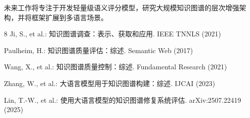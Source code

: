 \documentclass[runningheads]{llncs}
\begin{document}
未来工作将专注于开发轻量级语义评分模型，研究大规模知识图谱的层次增强架构，并将框架扩展到多语言场景。

\begin{thebibliography}{8}
Ji, S., et al.: 知识图谱调查：表示、获取和应用. IEEE TNNLS (2021)

Paulheim, H.: 知识图谱质量评估：综述. Semantic Web (2017)

Wang, X., et al.: 知识图谱质量控制：综述. Fundamental Research (2021)

Zhang, W., et al.: 大语言模型用于知识图谱构建：综述. IJCAI (2023)

Lin, T.-W., et al.: 使用大语言模型的知识图谱修复系统评估. arXiv:2507.22419 (2025)
\end{thebibliography}
\end{document}
